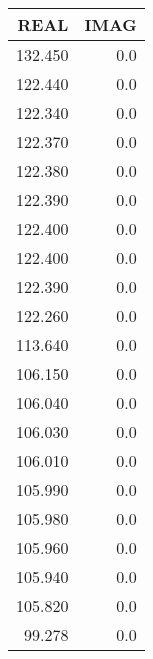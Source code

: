 \begin{tabular}{rr}
\toprule
   REAL &  IMAG \\
\midrule
132.450 &   0.0 \\
122.440 &   0.0 \\
122.340 &   0.0 \\
122.370 &   0.0 \\
122.380 &   0.0 \\
122.390 &   0.0 \\
122.400 &   0.0 \\
122.400 &   0.0 \\
122.390 &   0.0 \\
122.260 &   0.0 \\
113.640 &   0.0 \\
106.150 &   0.0 \\
106.040 &   0.0 \\
106.030 &   0.0 \\
106.010 &   0.0 \\
105.990 &   0.0 \\
105.980 &   0.0 \\
105.960 &   0.0 \\
105.940 &   0.0 \\
105.820 &   0.0 \\
 99.278 &   0.0 \\
\bottomrule
\end{tabular}
